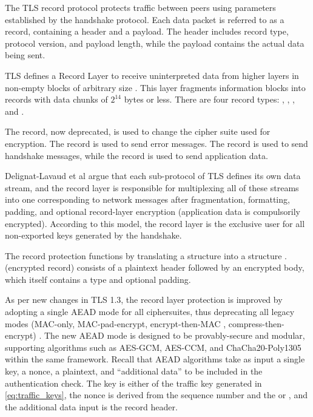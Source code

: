 The TLS record protocol \cite{rfc8446} protects traffic between peers using parameters established by the handshake protocol. Each data packet is referred to as a record, containing a header and a payload. The header includes record type, protocol version, and payload length, while the payload contains the actual data being sent.

TLS defines a Record Layer to receive uninterpreted data from higher layers in non-empty blocks of arbitrary size \cite{rfc2246}. This layer fragments information blocks into  records with data chunks of $2^{14}$ bytes or less. There are four record types: , , , and .

The  record, now deprecated, is used to change the cipher suite used for encryption. The  record is used to send error messages. The  record is used to send handshake messages, while the  record is used to send application data.

Delignat-Lavaud et al \cite{7958593} argue that each sub-protocol of TLS defines its own data stream, and the record layer is responsible for multiplexing all of these streams into one corresponding to network messages after fragmentation, formatting, padding, and optional record-layer encryption (application data is compulsorily encrypted). According to this model, the record layer is the exclusive user for all non-exported keys generated by the handshake. 

The record protection functions by translating a  structure into a  structure \cite{rfc8446}.  (encrypted record) consists of a plaintext header followed by an encrypted body, which itself contains a type and optional padding.

As per new changes in TLS 1.3, the record layer protection is improved by adopting a single AEAD mode for all ciphersuites, thus deprecating all legacy modes (MAC-only, MAC-pad-encrypt, encrypt-then-MAC \cite{rfc7366}, compress-then-encrypt) \cite{7958593}. The new AEAD mode is designed to be provably-secure and modular, supporting algorithms such as AES-GCM, AES-CCM, and ChaCha20-Poly1305 within the same framework. Recall that AEAD algorithms take as input a single key, a nonce, a plaintext, and ``additional data'' to be included in the authentication check. The key is either of the traffic key generated in \ref{eq:traffic_keys}, the nonce is derived from the sequence number and the  or , and the additional data input is the record header.

